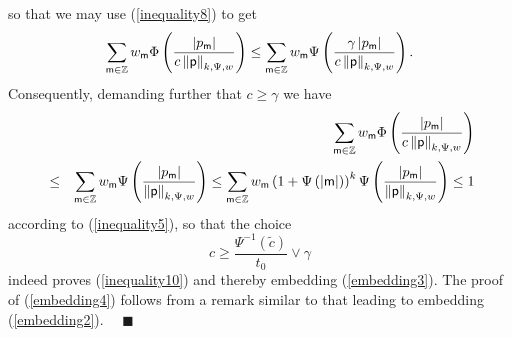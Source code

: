 \documentclass{article}
\begin{document}
so that we may use (\ref{inequality8}) to get%
\begin{equation*}
\sum_{\mathsf{m}\in \mathbb{Z}}w_{\mathsf{m}}\Phi \left( \frac{\left\vert p_{%
\mathsf{m}}\right\vert }{c\left\Vert \mathsf{p}\right\Vert _{k,\Psi ,w}}%
\right) \leq \sum_{\mathsf{m}\in \mathbb{Z}}w_{\mathsf{m}}\Psi \left( \frac{%
\gamma \left\vert p_{\mathsf{m}}\right\vert }{c\left\Vert \mathsf{p}%
\right\Vert _{k,\Psi ,w}}\right) \text{.}
\end{equation*}%
Consequently, demanding further that $c\geq \gamma $ we have%
\begin{eqnarray*}
&&\sum_{\mathsf{m}\in \mathbb{Z}}w_{\mathsf{m}}\Phi \left( \frac{\left\vert
p_{\mathsf{m}}\right\vert }{c\left\Vert \mathsf{p}\right\Vert _{k,\Psi ,w}}%
\right) \\
&\leq &\sum_{\mathsf{m}\in \mathbb{Z}}w_{\mathsf{m}}\Psi \left( \frac{%
\left\vert p_{\mathsf{m}}\right\vert }{\left\Vert \mathsf{p}\right\Vert
_{k,\Psi ,w}}\right) \leq \sum_{\mathsf{m}\in \mathbb{Z}}w_{\mathsf{m}%
}\left( 1+\Psi \left( \left\vert \mathsf{m}\right\vert \right) \right)
^{k}\Psi \left( \frac{\left\vert p_{\mathsf{m}}\right\vert }{\left\Vert 
\mathsf{p}\right\Vert _{k,\Psi ,w}}\right) \leq 1
\end{eqnarray*}%
according to (\ref{inequality5}), so that the choice%
\begin{equation*}
c\geq \frac{\Psi ^{-1}\left( \tilde{c}\right) }{t_{0}}\vee \gamma
\end{equation*}%
indeed proves (\ref{inequality10}) and thereby embedding (\ref{embedding3}).
The proof of (\ref{embedding4}) follows from a remark similar to that
leading to embedding (\ref{embedding2}). \ \ $\blacksquare $

\bigskip
\end{document}
